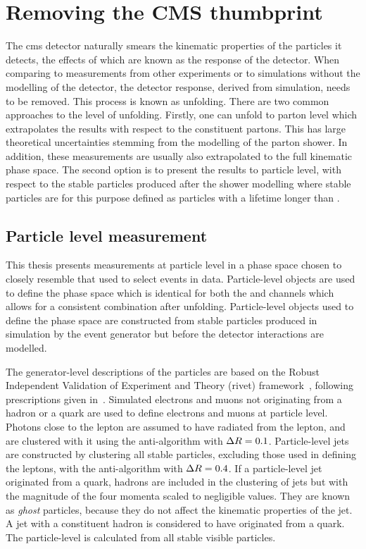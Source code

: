 \chapter{Removing the CMS thumbprint}
\label{ch:unfolding}

The \acrshort{cms} detector naturally smears the kinematic properties of the particles it detects, the effects of which are known as the response of the detector.
When comparing to measurements from other experiments or to simulations without the modelling of the detector, the detector response, derived from simulation, needs to be removed.
This process is known as unfolding.
There are two common approaches to the level of unfolding.
Firstly, one can unfold to parton level which extrapolates the results with respect to the constituent partons.
This has large theoretical uncertainties stemming from the modelling of the parton shower.
In addition, these measurements are usually also extrapolated to the full kinematic phase space.
The second option is to present the results to particle level, \ie{} with respect to the stable particles produced after the shower modelling where stable particles are for this purpose defined as particles with a lifetime longer than \particleLifetime{}.

\section{Particle level measurement} %
\label{sec:particle_level}

This thesis presents measurements at particle level in a phase space chosen to closely resemble that used to select events in data.
Particle-level objects are used to define the phase space which is identical for both the \eJets{} and \muJets{} channels which allows for a consistent combination after unfolding.
Particle-level objects used to define the phase space are constructed from stable particles produced in simulation by the event generator but before the detector interactions are modelled.

The generator-level descriptions of the particles are based on the Robust Independent Validation of Experiment and Theory (\acrshort{rivet}) framework~\cite{Unfold:Rivet}, following prescriptions given in~\cite{Unfold:pseudoTop}.
Simulated electrons and muons not originating from a hadron or a quark are used to define electrons and muons at particle level.  
Photons close to the lepton are assumed to have radiated from the lepton, and are clustered with it using the anti-\kt algorithm with $\Delta R=0.1$.  
Particle-level jets are constructed by clustering all stable particles, excluding those used in defining the leptons, with the anti-\kt algorithm with $\Delta R=0.4$.
If a particle-level jet originated from a \bquark{} quark, \bquark{} hadrons are included in the clustering of jets but with the magnitude of the four momenta scaled to negligible values. 
They are known as \textit{ghost} particles, because they do not affect the kinematic properties of the jet.
A jet with a constituent \bquark{} hadron is considered to have originated from a \bquark{} quark.
The particle-level \ptmiss{} is calculated from all stable visible particles.

